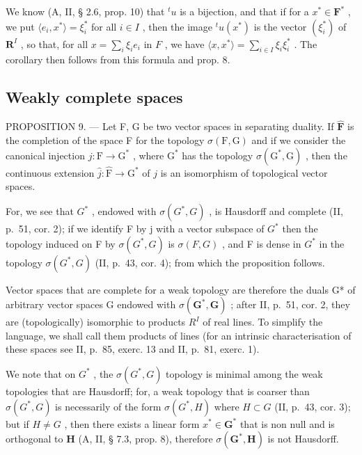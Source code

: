 We know (A, II, § 2.6, prop. 10) that \({}^t u\) is a bijection, and that if for a \(x^* \in \mathbf{F}^*\) , we put \(\langle e_i, x^* \rangle = \xi_i^*\) for all \(i \in I\) , then the image \({}^t u(x^*)\) is the vector \((\xi_i^*)\) of \(\mathbf{R}^I\) , so that, for all \(x = \sum_{i} \xi_i e_i\) in \(F\) , we have \(\langle x, x^* \rangle = \sum_{i \in I} \xi_i \xi_i^*\) . The corollary then follows from this formula and prop. 8.

\subsection{Weakly complete spaces}

PROPOSITION 9. --- Let F, G be two vector spaces in separating duality. If \(\hat{\mathbf{F}}\) is the completion of the space F for the topology \(\sigma(\mathrm{F},\mathrm{G})\) and if we consider the canonical injection \(j:\mathrm{F}\to\mathrm{G}^{*}\) , where \(\mathrm{G}^{*}\) has the topology \(\sigma(\mathrm{G}^{*},\mathrm{G})\) , then the continuous extension \(\hat{j}:\hat{\mathrm{F}}\to\mathrm{G}^{*}\) of \(j\) is an isomorphism of topological vector spaces.

For, we see that \(G^{*}\) , endowed with \(\sigma(G^{*}, G)\) , is Hausdorff and complete (II, p.~51, cor. 2); if we identify F by j with a vector subspace of \(G^{*}\) then the topology induced on F by \(\sigma(G^{*}, G)\) is \(\sigma(F, G)\) , and F is dense in \(G^{*}\) in the topology \(\sigma(G^{*}, G)\) (II, p.~43, cor. 4); from which the proposition follows.

Vector spaces that are complete for a weak topology are therefore the duals G* of arbitrary vector spaces G endowed with \(\sigma(\mathbf{G}^{*}, \mathbf{G})\) ; after II, p.~51, cor. 2, they are (topologically) isomorphic to products \(R^{I}\) of real lines. To simplify the language, we shall call them products of lines (for an intrinsic characterisation of these spaces see II, p.~85, exerc. 13 and II, p.~81, exerc. 1).

We note that on \(G^{*}\) , the \(\sigma(G^{*}, G)\) topology is minimal among the weak topologies that are Hausdorff; for, a weak topology that is coarser than \(\sigma(G^{*}, G)\) is necessarily of the form \(\sigma(G^{*}, H)\) where \(H \subset G\) (II, p.~43, cor. 3); but if \(H \neq G\) , then there exists a linear form \(x^{*} \in \mathbf{G}^{*}\) that is non null and is orthogonal to \(\mathbf{H}\) (A, II, § 7.3, prop. 8), therefore \(\sigma(\mathbf{G}^{*}, \mathbf{H})\) is not Hausdorff.

